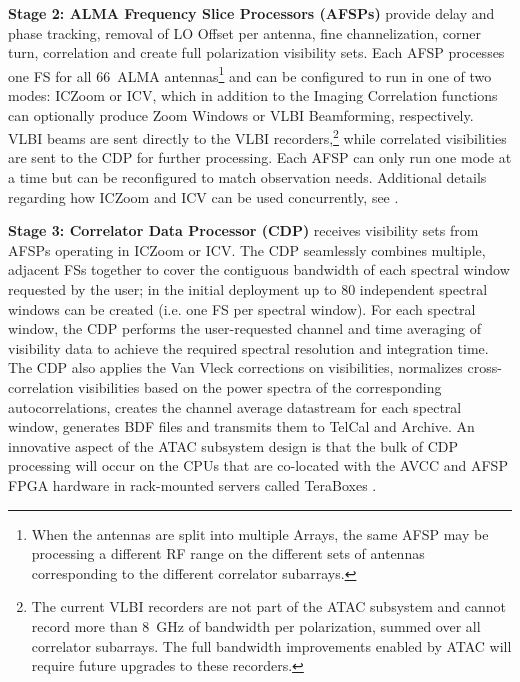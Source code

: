 \noindent
\textbf{Stage 2: ALMA Frequency Slice Processors (\acs{AFSP}s)} provide delay and phase tracking, removal of LO Offset per antenna, fine channelization, corner turn, correlation and create full polarization visibility sets. Each \ac{AFSP} processes one \ac{FS} for all 66~\ac{ALMA} antennas\footnote{When the antennas are split into multiple Arrays, the same \ac{AFSP} may be processing a different \ac{RF} range on the different sets of antennas corresponding to the different correlator subarrays.} and can be configured to run in one of two modes: \ac{ICZoom} or \ac{ICV}, which in addition to the Imaging Correlation functions can optionally produce Zoom Windows or \ac{VLBI} Beamforming, respectively.
\ac{VLBI} beams are sent directly to the \ac{VLBI} recorders,\footnote{The current VLBI recorders are not part of the ATAC subsystem and cannot record more than 8~GHz of bandwidth per polarization, summed over all correlator subarrays. The full bandwidth improvements enabled by ATAC will require future upgrades to these recorders.} while correlated visibilities are sent to the \ac{CDP} for further processing.
Each \ac{AFSP} can only run one mode at a time but can be reconfigured to match observation needs.
Additional details regarding how \ac{ICZoom} and \ac{ICV} can be used concurrently, see \cite{Memo023}.

\noindent
\textbf{Stage 3: Correlator Data Processor (\acs{CDP})} receives visibility sets from \acp{AFSP} operating in \ac{ICZoom} or \ac{ICV}.
The \ac{CDP} seamlessly combines multiple, adjacent \acp{FS} together to cover the contiguous
bandwidth of each spectral window requested by the user; in the initial deployment up to 80 independent spectral windows can be created (i.e. one \ac{FS} per spectral window).
For each spectral window, the \ac{CDP} performs the user-requested channel and time averaging of visibility data to achieve the required spectral resolution and integration time.
The \ac{CDP} also applies the Van Vleck corrections on visibilities, normalizes cross-correlation visibilities based on the power spectra of the corresponding autocorrelations, creates the channel average datastream for each spectral window, generates \ac{BDF} files and transmits them to TelCal and Archive.
An innovative aspect of the \ac{ATAC} subsystem design is that the bulk of \ac{CDP} processing will occur on the \acp{CPU} that are co-located with the \ac{AVCC} and \ac{AFSP} \ac{FPGA} hardware in rack-mounted servers called TeraBoxes \cite{atac_sdd_dd-1}.



